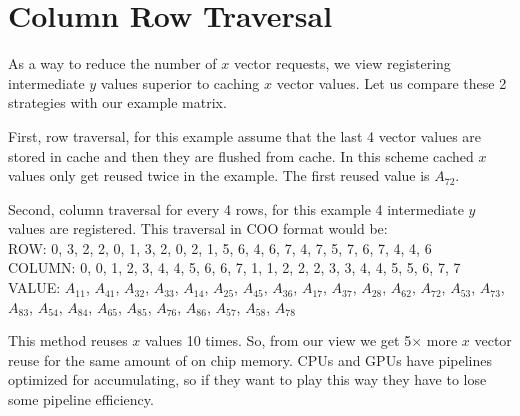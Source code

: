 \section{Column Row Traversal}
\label{sec:colrow}
    As a way to reduce the number of $x$ vector requests, we view registering intermediate $y$ values superior to caching $x$ vector values. Let us compare these 2 strategies with our example matrix. \par
First, row traversal, for this example assume that the last 4 vector values are stored in cache and then they are flushed from cache. In this scheme cached $x$ values only get reused twice in the example. The first reused value is $A_{72}$. \par
Second, column traversal for every 4 rows, for this example 4 intermediate $y$ values are registered. This traversal in COO format would be:\\
ROW: 0, 3, 2, 2, 0, 1, 3, 2, 0, 2, 1, 5, 6, 4, 6, 7, 4, 7, 5, 7, 6, 7, 4, 4, 6\\
COLUMN: 0, 0, 1, 2, 3, 4, 4, 5, 6, 6, 7, 1, 1, 2, 2, 2, 3, 3, 4, 4, 5, 5, 6, 7, 7\\
VALUE: $A_{11}$, $A_{41}$, $A_{32}$, $A_{33}$, $A_{14}$, $A_{25}$, $A_{45}$, $A_{36}$, $A_{17}$, $A_{37}$, $A_{28}$, $A_{62}$, $A_{72}$, $A_{53}$, $A_{73}$, $A_{83}$, $A_{54}$, $A_{84}$, $A_{65}$, $A_{85}$, $A_{76}$, $A_{86}$, $A_{57}$, $A_{58}$, $A_{78}$\par
This method reuses $x$ values 10 times. So, from our view we get 5$\times$ more $x$ vector reuse for the same amount of on chip memory. CPUs and GPUs have pipelines optimized for accumulating, so if they want to play this way they have to lose some pipeline efficiency.
